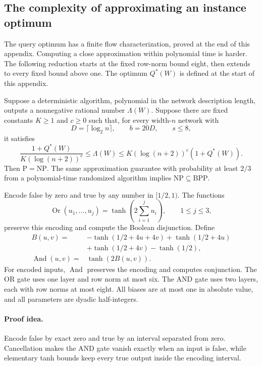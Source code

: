 \subsection{The complexity of approximating an instance optimum}
\label{sec:instance-hardness}

The query optimum has a finite flow characterization, proved at
the end of this appendix. Computing a close approximation within
polynomial time is harder. The following reduction starts at the
fixed row-norm bound eight, then extends to every fixed bound above
one.  The optimum \(Q^*(W)\) is defined at the start of this
appendix.

\begin{proposition}
\label{prop:instance-hardness-eight}
Suppose a deterministic algorithm, polynomial in the network
description length, outputs a nonnegative rational number \(\Lambda(W)\).
Suppose there are fixed constants \(K\ge1\) and \(c\ge0\) such that,
for every width-\(n\) network with
\[
 D=\lceil\log_2n\rceil,\qquad b=20D,\qquad s\le8,
\]
it satisfies
\[
 \frac{1+Q^*(W)}{K(\log(n+2))^c}
 \le\Lambda(W)\le
 K(\log(n+2))^c(1+Q^*(W)).
\]
Then \(\mathrm P=\mathrm{NP}\).
The same approximation guarantee with probability at least \(2/3\)
from a polynomial-time randomized algorithm implies
\(\mathrm{NP}\subseteq\mathrm{BPP}\).
\end{proposition}

\begin{lemma}
\label{lem:zero-positive-gates}
Encode false by zero and true by any number in \([1/2,1)\).
The functions
\[
 \operatorname{Or}(u_1,\ldots,u_j)
 =\tanh\left(2\sum_{i=1}^j u_i\right),\qquad 1\le j\le3,
\]
preserve this encoding and compute the Boolean disjunction.
Define
\begin{align*}
 B(u,v)={}&-\tanh(1/2+4u+4v)
       +\tanh(1/2+4u)\\
       &+\tanh(1/2+4v)-\tanh(1/2),\\
 \operatorname{And}(u,v)={}&\tanh(2B(u,v)).
\end{align*}
For encoded inputs, \(\operatorname{And}\) preserves the encoding
and computes conjunction.  The OR gate uses one layer and row norm
at most six.  The AND gate uses two layers, each with row norms at
most eight.  All biases are at most one in absolute value, and all
parameters are dyadic half-integers.
\end{lemma}

\paragraph{Proof idea.}
Encode false by exact zero and true by an interval separated from
zero. Cancellation makes the AND gate vanish exactly when an input is false,
while elementary tanh bounds keep every true output inside the encoding
interval.


